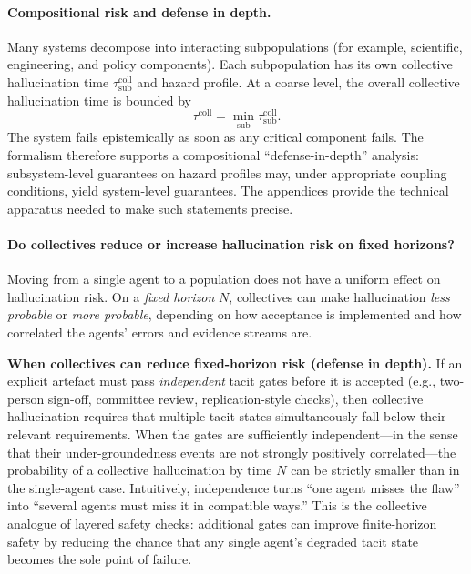 \paragraph{Compositional risk and defense in depth.}
Many systems decompose into interacting subpopulations (for example, scientific, engineering, and policy components). Each subpopulation has its own collective hallucination time $\tau^{\mathrm{coll}}_{\mathrm{sub}}$ and hazard profile. At a coarse level, the overall collective hallucination time is bounded by
\[
  \tau^{\mathrm{coll}} = \min_{\mathrm{sub}} \tau^{\mathrm{coll}}_{\mathrm{sub}}.
\]
The system fails epistemically as soon as any critical component fails. The formalism therefore supports a compositional ``defense-in-depth'' analysis: subsystem-level guarantees on hazard profiles may, under appropriate coupling conditions, yield system-level guarantees. The appendices provide the technical apparatus needed to make such statements precise.
\paragraph{Do collectives reduce or increase hallucination risk on fixed horizons?}
Moving from a single agent to a population does not have a uniform effect on hallucination risk. On a
\emph{fixed horizon} \(N\), collectives can make hallucination \emph{less probable} or \emph{more probable},
depending on how acceptance is implemented and how correlated the agents' errors and evidence streams are.

\smallskip
\noindent
\textbf{When collectives can reduce fixed-horizon risk (defense in depth).}
If an explicit artefact must pass \emph{independent} tacit gates before it is accepted (e.g., two-person
sign-off, committee review, replication-style checks), then collective hallucination requires that multiple tacit states
simultaneously fall below their relevant requirements. When the gates are sufficiently independent---in the
sense that their under-groundedness events are not strongly positively correlated---the probability of a
collective hallucination by time \(N\) can be strictly smaller than in the single-agent case. Intuitively,
independence turns ``one agent misses the flaw'' into ``several agents must miss it in compatible ways.''
This is the collective analogue of layered safety checks: additional gates can improve finite-horizon safety
by reducing the chance that any single agent's degraded tacit state becomes the sole point of failure.

